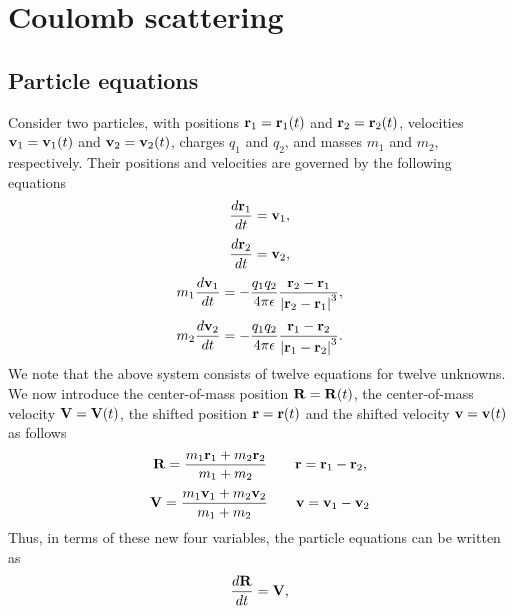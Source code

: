 \documentclass[oneside,a4paper,11pt]{report}
\begin{document}
\section{Coulomb scattering}
\subsection{Particle equations}
Consider two particles, with positions $\mathbf{r}_1=\mathbf{r}_1(t)$ and $\mathbf{r}_2=\mathbf{r}_2(t)$, velocities $\mathbf{v}_1=\mathbf{v}_1(t)$ and $\mathbf{v}_2=\mathbf{v}_2(t)$, charges $q_1$ and $q_2$, and masses $m_1$ and $m_2$, respectively. Their positions and velocities are governed by the following equations 
\begin{equation}
    \label{eq:particle_1_pos}
    \frac{d \mathbf{r}_1}{dt} = \mathbf{v}_1,
\end{equation}
\begin{equation}
    \label{eq:particle_2_pos}
    \frac{d \mathbf{r}_2}{dt} = \mathbf{v}_2,
\end{equation}
\begin{equation}
    \label{eq:particle_1_vel}
    m_1 \frac{d\mathbf{v}_1}{dt} = -\frac{q_1 q_2}{4 \pi \epsilon} \frac{\mathbf{r}_2 - \mathbf{r}_1}{\left | \mathbf{r}_2 - \mathbf{r}_1 \right |^3},
\end{equation}
\begin{equation}
    \label{eq:particle_2_vel}
    m_2 \frac{d\mathbf{v}_2}{dt} = -\frac{q_1 q_2}{4 \pi \epsilon} \frac{\mathbf{r}_1 - \mathbf{r}_2}{\left | \mathbf{r}_1 - \mathbf{r}_2 \right |^3}.
\end{equation}
We note that the above system consists of twelve equations for twelve unknowns. We now introduce the center-of-mass position $\mathbf{R} = \mathbf{R}(t)$, the center-of-mass velocity $\mathbf{V} = \mathbf{V}(t)$, the shifted position $\mathbf{r} = \mathbf{r}(t)$ and the shifted velocity $\mathbf{v} = \mathbf{v}(t)$ as follows
\begin{equation}
    \mathbf{R} = \frac{m_1 \mathbf{r}_1 + m_2 \mathbf{r}_2}{m_1 + m_2} \qquad \mathbf{r} = \mathbf{r}_1 - \mathbf{r}_2,
\end{equation}
\begin{equation}
    \mathbf{V} = \frac{m_1 \mathbf{v}_1 + m_2 \mathbf{v}_2}{m_1 + m_2} \qquad \mathbf{v} = \mathbf{v}_1 - \mathbf{v}_2
\end{equation}
Thus, in terms of these new four variables, the particle equations can be written as
\begin{equation}
    \frac{d \mathbf{R}}{dt} = \mathbf{V},
\end{equation}
\end{document}
